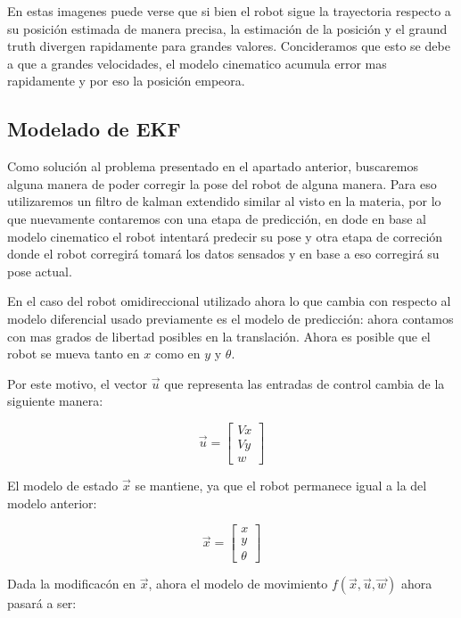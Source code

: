 En estas imagenes puede verse que si bien el robot sigue la trayectoria respecto a su posición estimada de manera precisa, la estimación de la posición y el graund truth divergen rapidamente para grandes valores. Concideramos que esto se debe a que a grandes velocidades, el modelo cinematico acumula error mas rapidamente y por eso la posición empeora.

\subsection{Modelado de EKF}

Como solución al problema presentado en el apartado anterior, buscaremos alguna manera de poder corregir la pose del robot de alguna manera. Para eso utilizaremos un filtro de kalman extendido similar al visto en la materia, por lo que nuevamente contaremos con una etapa de predicción, en dode en base al modelo cinematico el robot intentará predecir su pose y otra etapa de correción donde el robot corregirá tomará los datos sensados y en base a eso corregirá su pose actual.

En el caso del robot omidireccional utilizado ahora lo que cambia con respecto al modelo diferencial usado previamente es el modelo de predicción: ahora contamos con mas grados de libertad posibles en la translación. Ahora es posible que el robot se mueva tanto en $x$ como en $y$ y $\theta$.

Por este motivo, el vector $\overrightarrow{u}$ que representa las entradas de control cambia de la siguiente manera:

$$\overrightarrow{u} = \begin{bmatrix}
         Vx \\
         Vy \\
         w 
        \end{bmatrix}$$


El modelo de estado $\overrightarrow{x}$ se mantiene, ya que el robot permanece igual a la del modelo anterior:

$$\overrightarrow{x} = \begin{bmatrix}
         x \\
         y \\
         \theta 
        \end{bmatrix}$$

Dada la modificacón en $\overrightarrow{x}$, ahora el modelo de movimiento $f(\overrightarrow{x},\overrightarrow{u}, \overrightarrow{w})$ ahora pasará a ser:

